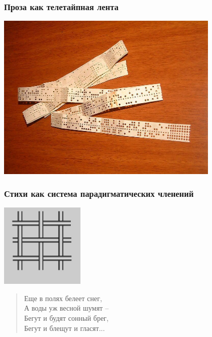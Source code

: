\documentclass{beamer}
\begin{document}

\begin{frame}
\frametitle{Проза как телетайпная лента}

\begin{center}
\includegraphics[width=0.8\textwidth]{lenta.jpg}
\end{center}

\end{frame}


\begin{frame}
\frametitle{Стихи как система парадигматических членений}

\begin{center}
\includegraphics[width=0.3\textwidth]{reshetka.jpg}
\end{center}

\begin{verse}
Еще в полях белеет \color{red}снег, \\
\color{black}А воды уж весной \color{green}шумят – \\
\color{blue}Бегут \color{black}и будят сонный \color{red}брег, \\
\color{blue}Бегут \color{black}и блещут и \color{green}гласят\color{black}...
\end{verse}
\end{frame}
\end{document}
